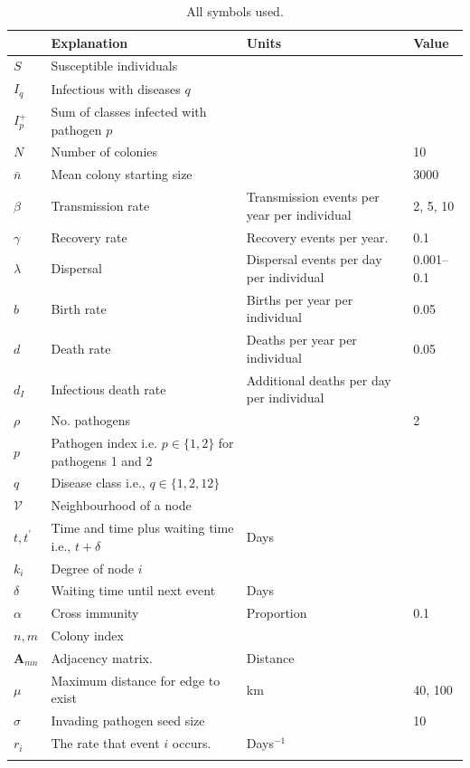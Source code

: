 
\begin{table}[b!]

\begin{tabular}{lp{5.6cm}p{4.3cm}l}
 & Explanation & Units&Value\\
\hline
$S$ & Susceptible individuals &&\\
$I_q$ & Infectious with diseases $q$ &&\\
$I^+_p$ & Sum of classes infected with pathogen $p$ &\\
$N$ & Number of colonies&& 10\\
$\bar{n}$ & Mean colony starting size && 3000\\
$\beta$ & Transmission rate & Transmission events per year per individual& 2, 5, 10\\
$\gamma$ & Recovery rate & Recovery events per year. & 0.1\\
$\lambda$ & Dispersal & Dispersal events per day per individual& 0.001--0.1\\
$b$ & Birth rate & Births per year per individual& 0.05\\
$d$ & Death rate & Deaths per year per individual & 0.05\\
$d_I$ & Infectious death rate & Additional deaths per day per individual&\\
$\rho$ & No. pathogens && 2\\
$p$ &  Pathogen index i.e. $p\in\{1,2\}$ for pathogens 1 and 2 & &\\
$q$ & Disease class i.e., $q\in\{1,2,12\}$&\\
$\mathcal{V}$ & Neighbourhood of a node &&\\
$t, t^\prime$ & Time and time plus waiting time i.e., $t+\delta$ & Days&\\
$k_i$ & Degree of node $i$ &&\\
$\delta$ & Waiting time until next event & Days&\\
$\alpha$ & Cross immunity & Proportion& 0.1\\
$n, m$ & Colony index &&\\
$\bm{A}_{mn}$ & Adjacency matrix. & Distance &\\
$\mu$ & Maximum distance for edge to exist & km& 40, 100\\
$\sigma$ & Invading pathogen seed size & & 10\\
$r_i$ & The rate that event $i$ occurs. & Days$^{-1}$&\\
&&&\\
\end{tabular}
\caption{All symbols used.}
\label{t:params}
\end{table}




